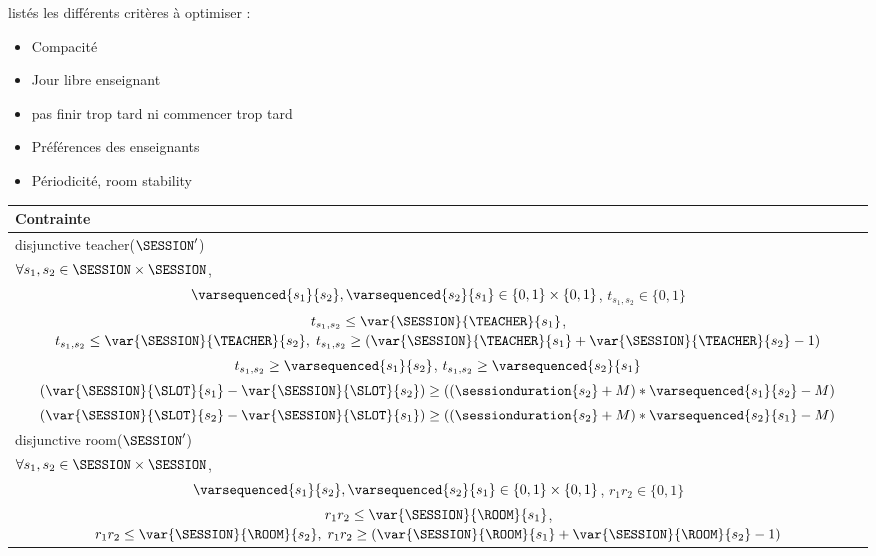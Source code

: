 listés les différents critères à optimiser :

\begin{itemize}
    \item Compacité 
    \item Jour libre enseignant
    \item pas finir trop tard ni commencer trop tard
    \item Préférences des enseignants
    \item Périodicité,  room stability
\end{itemize}


\begin{table}[!h]
    \centering
    
    \begin{tabular}{|lr|}
    \hline
    Contrainte & \\
    \hline
        disjunctive teacher($\SESSION'$) &  \\
        $\forall s_1,s_2 \in \SESSION \times \SESSION$, &\\
         \multicolumn{2}{|c|}{$ \varsequenced{s_1}{s_2}, \varsequenced{s_2}{s_1}\in \{0,1\} \times\{0,1\}$, $t_{s_1,s_2} \in  \{0,1\}$}\\
         \multicolumn{2}{|c|}{ $t_{s_1,s_2} \leq \var{\SESSION}{\TEACHER}{s_1}$, $t_{s_1,s_2} \leq \var{\SESSION}{\TEACHER}{s_2},\; t_{s_1,s_2} \geq (\var{\SESSION}{\TEACHER}{s_1} + \var{\SESSION}{\TEACHER}{s_2} -1 )$} \\
         \multicolumn{2}{|c|}{$t_{s_1,s_2} \geq \varsequenced{s_1}{s_2} $, $t_{s_1,s_2} \geq \varsequenced{s_2}{s_1} $}\\
         \multicolumn{2}{|c|}{ $(\var{\SESSION}{\SLOT}{s_1} - \var{\SESSION}{\SLOT}{s_2}) \geq ((\sessionduration{s_2}+M)*\varsequenced{s_1}{s_2} - M )$ }\\
         \multicolumn{2}{|c|}{ $(\var{\SESSION}{\SLOT}{s_2} - \var{\SESSION}{\SLOT}{s_1}) \geq ((\sessionduration{s_2}+M)*\varsequenced{s_2}{s_1} - M )$}\\
         \hline
         disjunctive room($\SESSION'$) & \\
         $\forall s_1,s_2 \in \SESSION \times \SESSION$,& \\
        \multicolumn{2}{|c|}{ $ \varsequenced{s_1}{s_2}, \varsequenced{s_2}{s_1}\in \{0,1\} \times\{0,1\}$, $r_1r_2 \in  \{0,1\}$}\\
         \multicolumn{2}{|c|}{ $r_1r_2 \leq \var{\SESSION}{\ROOM}{s_1}$, $r_1r_2 \leq \var{\SESSION}{\ROOM}{s_2}
         ,\;r_1r_2 \geq (\var{\SESSION}{\ROOM}{s_1} + \var{\SESSION}{\ROOM}{s_2} -1 )$} \\

\end{tabular}
\end{table}

